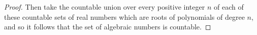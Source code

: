 \documentclass[11pt]{article}
\begin{document}
\begin{enumerate}
\begin{proof}
        Then take the countable union over every positive integer $n$ of each of these countable sets of real numbers which are roots of polynomials of degree $n$, and so it follows that the set of algebraic numbers is countable.
    \end{proof}
\end{enumerate}
\end{document}
